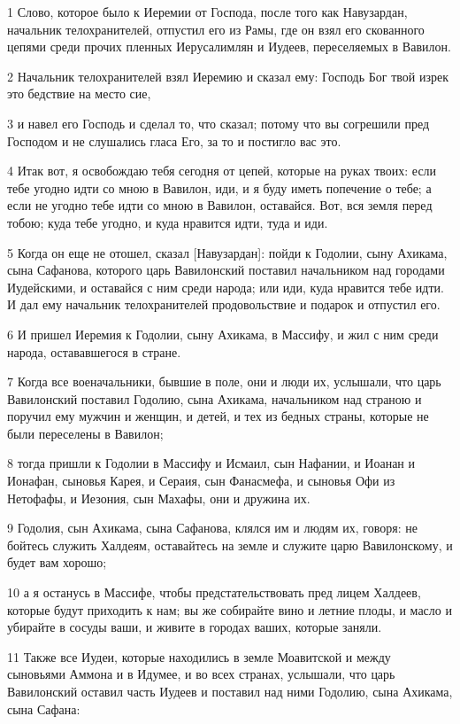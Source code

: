 \par 1 Слово, которое было к Иеремии от Господа, после того как Навузардан, начальник телохранителей, отпустил его из Рамы, где он взял его скованного цепями среди прочих пленных Иерусалимлян и Иудеев, переселяемых в Вавилон.
\par 2 Начальник телохранителей взял Иеремию и сказал ему: Господь Бог твой изрек это бедствие на место сие,
\par 3 и навел его Господь и сделал то, что сказал; потому что вы согрешили пред Господом и не слушались гласа Его, за то и постигло вас это.
\par 4 Итак вот, я освобождаю тебя сегодня от цепей, которые на руках твоих: если тебе угодно идти со мною в Вавилон, иди, и я буду иметь попечение о тебе; а если не угодно тебе идти со мною в Вавилон, оставайся. Вот, вся земля перед тобою; куда тебе угодно, и куда нравится идти, туда и иди.
\par 5 Когда он еще не отошел, сказал [Навузардан]: пойди к Годолии, сыну Ахикама, сына Сафанова, которого царь Вавилонский поставил начальником над городами Иудейскими, и оставайся с ним среди народа; или иди, куда нравится тебе идти. И дал ему начальник телохранителей продовольствие и подарок и отпустил его.
\par 6 И пришел Иеремия к Годолии, сыну Ахикама, в Массифу, и жил с ним среди народа, остававшегося в стране.
\par 7 Когда все военачальники, бывшие в поле, они и люди их, услышали, что царь Вавилонский поставил Годолию, сына Ахикама, начальником над страною и поручил ему мужчин и женщин, и детей, и тех из бедных страны, которые не были переселены в Вавилон;
\par 8 тогда пришли к Годолии в Массифу и Исмаил, сын Нафании, и Иоанан и Ионафан, сыновья Карея, и Сераия, сын Фанасмефа, и сыновья Офи из Нетофафы, и Иезония, сын Махафы, они и дружина их.
\par 9 Годолия, сын Ахикама, сына Сафанова, клялся им и людям их, говоря: не бойтесь служить Халдеям, оставайтесь на земле и служите царю Вавилонскому, и будет вам хорошо;
\par 10 а я останусь в Массифе, чтобы предстательствовать пред лицем Халдеев, которые будут приходить к нам; вы же собирайте вино и летние плоды, и масло и убирайте в сосуды ваши, и живите в городах ваших, которые заняли.
\par 11 Также все Иудеи, которые находились в земле Моавитской и между сыновьями Аммона и в Идумее, и во всех странах, услышали, что царь Вавилонский оставил часть Иудеев и поставил над ними Годолию, сына Ахикама, сына Сафана:
